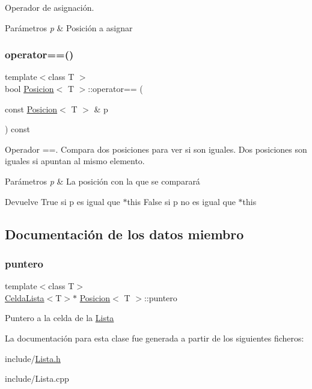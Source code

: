 Operador de asignación. 


\begin{DoxyParams}{Parámetros}
{\em p} & Posición a asignar \\
\hline
\end{DoxyParams}
\mbox{\label{classPosicion_a75a2ee78cb3ada83ba7165600c43583f}} 
\subsubsection{\texorpdfstring{operator==()}{operator==()}}
{\footnotesize\ttfamily template$<$class T $>$ \\
bool \mbox{\hyperlink{classPosicion}{Posicion}}$<$ T $>$\+::operator== (\begin{DoxyParamCaption}\item[{const \mbox{\hyperlink{classPosicion}{Posicion}}$<$ T $>$ \&}]{p }\end{DoxyParamCaption}) const}



Operador ==. Compara dos posiciones para ver si son iguales. Dos posiciones son iguales si apuntan al mismo elemento. 


\begin{DoxyParams}{Parámetros}
{\em p} & La posición con la que se comparará \\
\hline
\end{DoxyParams}
\begin{DoxyReturn}{Devuelve}
True si p es igual que $\ast$this False si p no es igual que $\ast$this 
\end{DoxyReturn}


\subsection{Documentación de los datos miembro}
\mbox{\label{classPosicion_afddf381142b097c87ef24c0cb1eb458c}} 
\subsubsection{\texorpdfstring{puntero}{puntero}}
{\footnotesize\ttfamily template$<$class T$>$ \\
\mbox{\hyperlink{structCeldaLista}{Celda\+Lista}}$<$T$>$$\ast$ \mbox{\hyperlink{classPosicion}{Posicion}}$<$ T $>$\+::puntero\hspace{0.3cm}{\ttfamily [private]}}

Puntero a la celda de la \mbox{\hyperlink{classLista}{Lista}} 

La documentación para esta clase fue generada a partir de los siguientes ficheros\+:\begin{DoxyCompactItemize}
\item 
include/\mbox{\hyperlink{Lista_8h}{Lista.\+h}}\item 
include/Lista.\+cpp\end{DoxyCompactItemize}
